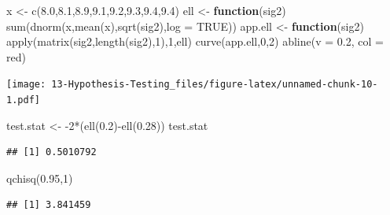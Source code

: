 \documentclass[
]{book}
\newenvironment{Shaded}{\begin{snugshade}}{\end{snugshade}}
\newcommand{\AttributeTok}[1]{\textcolor[rgb]{0.77,0.63,0.00}{#1}}
\newcommand{\ConstantTok}[1]{\textcolor[rgb]{0.00,0.00,0.00}{#1}}
\newcommand{\ControlFlowTok}[1]{\textcolor[rgb]{0.13,0.29,0.53}{\textbf{#1}}}
\newcommand{\DecValTok}[1]{\textcolor[rgb]{0.00,0.00,0.81}{#1}}
\newcommand{\FloatTok}[1]{\textcolor[rgb]{0.00,0.00,0.81}{#1}}
\newcommand{\FunctionTok}[1]{\textcolor[rgb]{0.00,0.00,0.00}{#1}}
\newcommand{\NormalTok}[1]{#1}
\newcommand{\OtherTok}[1]{\textcolor[rgb]{0.56,0.35,0.01}{#1}}
\newcommand{\SpecialCharTok}[1]{\textcolor[rgb]{0.00,0.00,0.00}{#1}}
\newcommand{\StringTok}[1]{\textcolor[rgb]{0.31,0.60,0.02}{#1}}
\begin{document}
\begin{Shaded}
\begin{Highlighting}[]
\NormalTok{x }\OtherTok{\textless{}{-}} \FunctionTok{c}\NormalTok{(}\FloatTok{8.0}\NormalTok{,}\FloatTok{8.1}\NormalTok{,}\FloatTok{8.9}\NormalTok{,}\FloatTok{9.1}\NormalTok{,}\FloatTok{9.2}\NormalTok{,}\FloatTok{9.3}\NormalTok{,}\FloatTok{9.4}\NormalTok{,}\FloatTok{9.4}\NormalTok{)}
\NormalTok{ell }\OtherTok{\textless{}{-}} \ControlFlowTok{function}\NormalTok{(sig2) }\FunctionTok{sum}\NormalTok{(}\FunctionTok{dnorm}\NormalTok{(x,}\FunctionTok{mean}\NormalTok{(x),}\FunctionTok{sqrt}\NormalTok{(sig2),}\AttributeTok{log =} \ConstantTok{TRUE}\NormalTok{))}
\NormalTok{app.ell }\OtherTok{\textless{}{-}} \ControlFlowTok{function}\NormalTok{(sig2) }\FunctionTok{apply}\NormalTok{(}\FunctionTok{matrix}\NormalTok{(sig2,}\FunctionTok{length}\NormalTok{(sig2),}\DecValTok{1}\NormalTok{),}\DecValTok{1}\NormalTok{,ell)}
\FunctionTok{curve}\NormalTok{(app.ell,}\DecValTok{0}\NormalTok{,}\DecValTok{2}\NormalTok{)  }
\FunctionTok{abline}\NormalTok{(}\AttributeTok{v =} \FloatTok{0.2}\NormalTok{, }\AttributeTok{col =} \StringTok{\textquotesingle{}red\textquotesingle{}}\NormalTok{)}
\end{Highlighting}
\end{Shaded}

\texttt{[image: 13-Hypothesis-Testing\_files/figure-latex/unnamed-chunk-10-1.pdf]}

\begin{Shaded}
\begin{Highlighting}[]
\NormalTok{test.stat }\OtherTok{\textless{}{-}} \SpecialCharTok{{-}}\DecValTok{2}\SpecialCharTok{*}\NormalTok{(}\FunctionTok{ell}\NormalTok{(}\FloatTok{0.2}\NormalTok{)}\SpecialCharTok{{-}}\FunctionTok{ell}\NormalTok{(}\FloatTok{0.28}\NormalTok{))}
\NormalTok{test.stat}
\end{Highlighting}
\end{Shaded}

\begin{verbatim}
## [1] 0.5010792
\end{verbatim}

\begin{Shaded}
\begin{Highlighting}[]
\FunctionTok{qchisq}\NormalTok{(}\FloatTok{0.95}\NormalTok{,}\DecValTok{1}\NormalTok{)}
\end{Highlighting}
\end{Shaded}

\begin{verbatim}
## [1] 3.841459
\end{verbatim}
\end{document}
